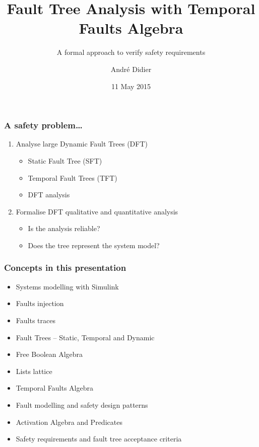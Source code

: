 \documentclass{beamer}
\title{Fault Tree Analysis with Temporal Faults Algebra}
\subtitle{A formal approach to verify safety requirements}
\author{André Didier}
\date{11 May 2015}
\begin{document}
\begin{frame}
\titlepage
\end{frame}

\begin{frame}
\frametitle{A safety problem\ldots}
\begin{enumerate}
  \item Analyse \alert<4>{large} Dynamic Fault Trees (DFT)\\
    \begin{minipage}[c]{4.60cm}
        \begin{itemize}
          \item Static Fault Tree (SFT) 
          \item Temporal Fault Trees (TFT)
          \item DFT analysis 
        \end{itemize}
    \end{minipage}
    \begin{minipage}[c]{5.3cm}
    \end{minipage}
  \item Formalise DFT qualitative and quantitative analysis
    \begin{itemize}
      \item<3-> Is the analysis reliable?
      \item<3-> Does the tree represent the system model?
    \end{itemize}
\end{enumerate}
\end{frame}

\begin{frame}
\frametitle{Concepts in this presentation}

\begin{itemize}
  \item \alert<2>{Systems modelling with Simulink}
  \item \alert<2>{Faults injection}
  \item \alert<2>{Faults traces}
  \item Fault Trees -- \alert<2>{Static}, Temporal and Dynamic
  \item Free Boolean Algebra
  \item Lists lattice
  \item Temporal Faults Algebra
  \item Fault modelling and safety design patterns
  \item Activation Algebra and Predicates
  \item Safety requirements and fault tree acceptance criteria
\end{itemize}

\end{frame}
\end{document}
